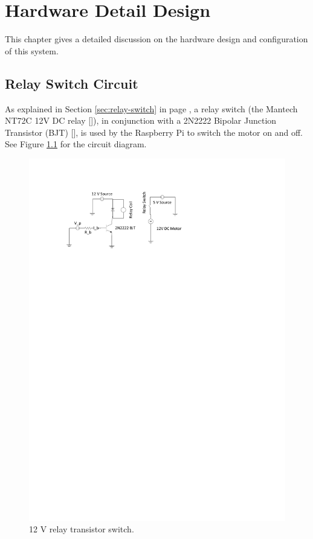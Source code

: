 \chapter{Hardware Detail Design}
\label{chap:5}

This chapter gives a detailed discussion on the hardware design and
configuration of this system. 


\section{Relay Switch Circuit}
\label{sec:detail-switch}

As explained in Section \ref{sec:relay-switch} in page \pageref{sec:relay-switch}, a relay
switch (the Mantech NT72C 12V DC relay [\cite{manual:relay-specs}]), in conjunction with a 2N2222
Bipolar Junction Transistor (BJT) [\cite{maunual:transistor-datasheet}], is used
by the Raspberry Pi to switch the motor on and off. See Figure
\ref{fig:relay-switch} for the circuit diagram.

\begin{figure}
\centering
\includegraphics[clip = true, trim = 0 640 0 70, scale=1]{relay_switch}
\caption{12 V relay transistor switch.}
\label{fig:relay-switch}
\end{figure}

